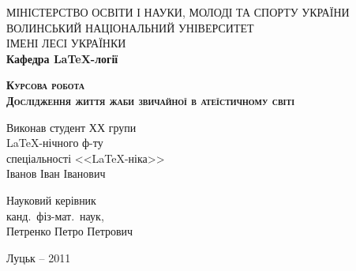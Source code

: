 
\newpage
\begin{titlepage}
\begin{center}
МІНІСТЕРСТВО ОСВІТИ І НАУКИ, МОЛОДІ ТА СПОРТУ УКРАЇНИ \\
\vspace{1em}
ВОЛИНСЬКИЙ НАЦІОНАЛЬНИЙ УНІВЕРСИТЕТ \\ ІМЕНІ ЛЕСІ УКРАЇНКИ \\
\vspace{2em}
\textbf{Кафедра \LaTeX -логії}
\end{center}
\vspace{5em}

\begin{center}
\Large{\textbf{\textsc{Курсова робота}}}\\  
\LARGE{\textsc{\textbf{Дослідження життя жаби звичайної в атеїстичному світі}}}
\end{center}

\vspace{2em}

\begin{flushleft}
\hspace{9cm}Виконав студент ХХ групи\\
\hspace{9cm}\LaTeX -нічного ф-ту\\
\hspace{9cm}спеціальності <<\LaTeX -ніка>>\\
\hspace{9cm}Іванов Іван Іванович\\

\vspace{2em}

\hspace{9cm}Науковий керівник\\
\hspace{9cm}канд.~фіз-мат.~наук,\\
\hspace{9cm}Петренко Петро Петрович

\end{flushleft}

\vspace{\fill}

\begin{center}
Луцьк -- 2011
\end{center}				
\end{titlepage}